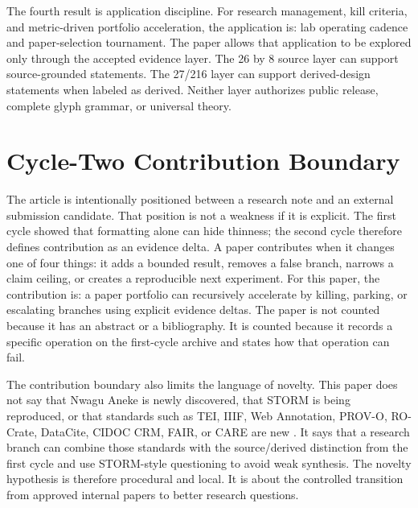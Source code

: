 \documentclass[sigconf,nonacm]{acmart}
\begin{document}
The fourth result is application discipline. For research management, kill criteria, and metric-driven portfolio acceleration, the application is:
lab operating cadence and paper-selection tournament. The paper allows that application to be explored only through the
accepted evidence layer. The 26 by 8 source layer can support source-grounded
statements. The 27/216 layer can support derived-design statements when labeled
as derived. Neither layer authorizes public release, complete glyph grammar, or
universal theory.


\section{Cycle-Two Contribution Boundary}
The article is intentionally positioned between a research note and an external
submission candidate. That position is not a weakness if it is explicit. The
first cycle showed that formatting alone can hide thinness; the second cycle
therefore defines contribution as an evidence delta. A paper contributes when it
changes one of four things: it adds a bounded result, removes a false branch,
narrows a claim ceiling, or creates a reproducible next experiment. For this
paper, the contribution is: a paper portfolio can recursively accelerate by killing, parking, or escalating branches using explicit evidence deltas. The paper is not counted because it has an
abstract or a bibliography. It is counted because it records a specific
operation on the first-cycle archive and states how that operation can fail.

The contribution boundary also limits the language of novelty. This paper does
not say that Nwagu Aneke is newly discovered, that STORM is being reproduced, or
that standards such as TEI, IIIF, Web Annotation, PROV-O, RO-Crate, DataCite,
CIDOC CRM, FAIR, or CARE are new \cite{teiP5Glyphs,iiifPresentation3,w3cAnnotationModel,w3cAnnotationVocab,w3cProvO,rocrate12,cidocCrm,datacite45,wilkinson2016fair,carroll2020care}. It says that a research
branch can combine those standards with the source/derived distinction from the
first cycle and use STORM-style questioning to avoid weak synthesis. The novelty
hypothesis is therefore procedural and local. It is about the controlled
transition from approved internal papers to better research questions.
\end{document}
